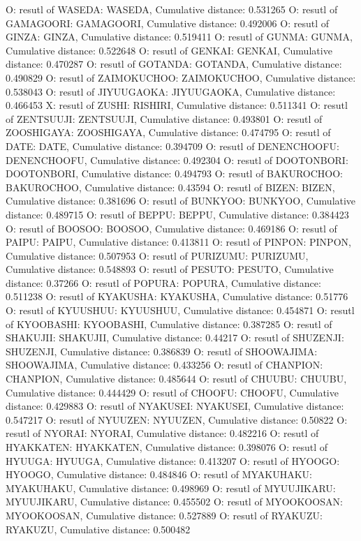 O: resutl of WASEDA: WASEDA, Cumulative distance: 0.531265
O: resutl of GAMAGOORI: GAMAGOORI, Cumulative distance: 0.492006
O: resutl of GINZA: GINZA, Cumulative distance: 0.519411
O: resutl of GUNMA: GUNMA, Cumulative distance: 0.522648
O: resutl of GENKAI: GENKAI, Cumulative distance: 0.470287
O: resutl of GOTANDA: GOTANDA, Cumulative distance: 0.490829
O: resutl of ZAIMOKUCHOO: ZAIMOKUCHOO, Cumulative distance: 0.538043
O: resutl of JIYUUGAOKA: JIYUUGAOKA, Cumulative distance: 0.466453
X: resutl of ZUSHI: RISHIRI, Cumulative distance: 0.511341
O: resutl of ZENTSUUJI: ZENTSUUJI, Cumulative distance: 0.493801
O: resutl of ZOOSHIGAYA: ZOOSHIGAYA, Cumulative distance: 0.474795
O: resutl of DATE: DATE, Cumulative distance: 0.394709
O: resutl of DENENCHOOFU: DENENCHOOFU, Cumulative distance: 0.492304
O: resutl of DOOTONBORI: DOOTONBORI, Cumulative distance: 0.494793
O: resutl of BAKUROCHOO: BAKUROCHOO, Cumulative distance: 0.43594
O: resutl of BIZEN: BIZEN, Cumulative distance: 0.381696
O: resutl of BUNKYOO: BUNKYOO, Cumulative distance: 0.489715
O: resutl of BEPPU: BEPPU, Cumulative distance: 0.384423
O: resutl of BOOSOO: BOOSOO, Cumulative distance: 0.469186
O: resutl of PAIPU: PAIPU, Cumulative distance: 0.413811
O: resutl of PINPON: PINPON, Cumulative distance: 0.507953
O: resutl of PURIZUMU: PURIZUMU, Cumulative distance: 0.548893
O: resutl of PESUTO: PESUTO, Cumulative distance: 0.37266
O: resutl of POPURA: POPURA, Cumulative distance: 0.511238
O: resutl of KYAKUSHA: KYAKUSHA, Cumulative distance: 0.51776
O: resutl of KYUUSHUU: KYUUSHUU, Cumulative distance: 0.454871
O: resutl of KYOOBASHI: KYOOBASHI, Cumulative distance: 0.387285
O: resutl of SHAKUJII: SHAKUJII, Cumulative distance: 0.44217
O: resutl of SHUZENJI: SHUZENJI, Cumulative distance: 0.386839
O: resutl of SHOOWAJIMA: SHOOWAJIMA, Cumulative distance: 0.433256
O: resutl of CHANPION: CHANPION, Cumulative distance: 0.485644
O: resutl of CHUUBU: CHUUBU, Cumulative distance: 0.444429
O: resutl of CHOOFU: CHOOFU, Cumulative distance: 0.429883
O: resutl of NYAKUSEI: NYAKUSEI, Cumulative distance: 0.547217
O: resutl of NYUUZEN: NYUUZEN, Cumulative distance: 0.50822
O: resutl of NYORAI: NYORAI, Cumulative distance: 0.482216
O: resutl of HYAKKATEN: HYAKKATEN, Cumulative distance: 0.398076
O: resutl of HYUUGA: HYUUGA, Cumulative distance: 0.413207
O: resutl of HYOOGO: HYOOGO, Cumulative distance: 0.484846
O: resutl of MYAKUHAKU: MYAKUHAKU, Cumulative distance: 0.498969
O: resutl of MYUUJIKARU: MYUUJIKARU, Cumulative distance: 0.455502
O: resutl of MYOOKOOSAN: MYOOKOOSAN, Cumulative distance: 0.527889
O: resutl of RYAKUZU: RYAKUZU, Cumulative distance: 0.500482
